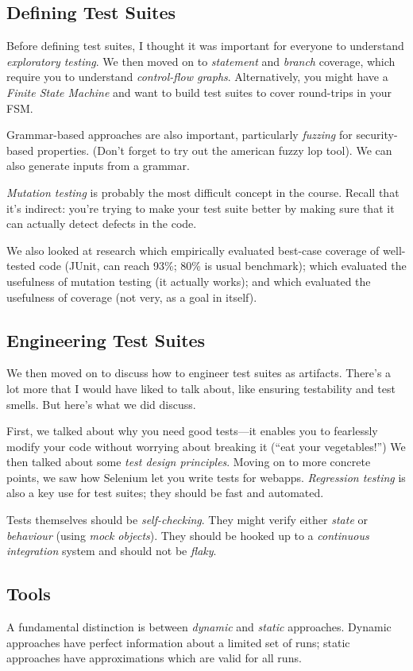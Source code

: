 \documentclass[11pt]{article}
\begin{document}
\subsection*{Defining Test Suites}
Before defining test suites, I thought it was important for everyone to understand
\emph{exploratory testing}. We then moved on to \emph{statement} and \emph{branch}
coverage, which require you to understand \emph{control-flow graphs}. Alternatively,
you might have a \emph{Finite State Machine} and want to build test suites to cover
round-trips in your FSM.

Grammar-based approaches are also important, particularly \emph{fuzzing} for security-based
properties. (Don't forget to try out the american fuzzy lop tool). We can also generate
inputs from a grammar.

\emph{Mutation testing} is probably the most difficult concept in the course. Recall that
it's indirect: you're trying to make your test suite better by making sure that it can actually
detect defects in the code.

We also looked at research which empirically evaluated best-case coverage of well-tested code
(JUnit, can reach 93\%; 80\% is usual benchmark); which evaluated the usefulness of mutation
testing (it actually works); and which evaluated the usefulness of coverage (not very, as a
goal in itself).

\subsection*{Engineering Test Suites}
We then moved on to discuss how to engineer test suites as artifacts. There's a lot more
that I would have liked to talk about, like ensuring testability and test smells. But here's
what we did discuss.

First, we talked about why you need good tests---it enables you to fearlessly modify your code
without worrying about breaking it (``eat your vegetables!'') We then talked about some
\emph{test design principles}. Moving on to more concrete points, we saw how Selenium let you
write tests for webapps. \emph{Regression testing} is also a key use for test suites; they should
be fast and automated.

Tests themselves should be \emph{self-checking}. They might verify either \emph{state} or
\emph{behaviour} (using \emph{mock objects}). They should be hooked up to a \emph{continuous
integration} system and should not be \emph{flaky}.

\subsection*{Tools}
A fundamental distinction is between \emph{dynamic} and \emph{static} approaches. Dynamic approaches
have perfect information about a limited set of runs; static approaches have approximations which
are valid for all runs.
\end{document}

